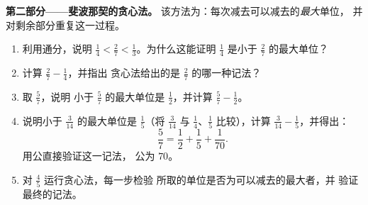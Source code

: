 \begin{problem}
\medskip
\noindent\textbf{第二部分——斐波那契的贪心法。}
该方法为：每次减去可以减去的\emph{最大}单位，
并对剩余部分重复这一过程。
\begin{enumerate}[resume]
  \item 利用通分，说明
        $\frac14 < \frac27 < \frac13$。为什么这能证明
        $\frac14$ 是小于
        $\frac27$ 的最大单位？
  \item 计算 $\frac27 - \frac14$，并指出
        贪心法给出的是 $\frac27$ 的哪一种记法？
  \item 取 $\frac57$，说明
        小于 $\frac57$ 的最大单位是 $\frac12$，并计算
        $\frac57 - \frac12$。
  \item 说明小于
        $\frac{3}{14}$ 的最大单位是 $\frac15$（将 $\frac{3}{14}$ 与
        $\frac14$、$\frac15$ 比较），计算
        $\frac{3}{14} - \frac15$，并得出：
        \[
        \frac57 = \frac12 + \frac15 + \frac{1}{70} .
        \]
        用公直接验证这一记法，
        公为 $70$。
  \item 对 $\frac45$ 运行贪心法，每一步检验
        所取的单位是否为可以减去的最大者，并
        验证最终的记法。
\end{enumerate}


\end{problem}
